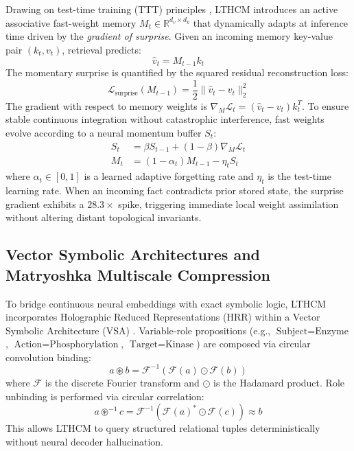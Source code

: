 \documentclass[11pt,a4paper]{article}
\begin{document}
Drawing on test-time training (TTT) principles \cite{behrouz2024titans}, LTHCM introduces an active associative fast-weight memory $M_t \in \mathbb{R}^{d_v \times d_k}$ that dynamically adapts at inference time driven by the \emph{gradient of surprise}. Given an incoming memory key-value pair $(k_t, v_t)$, retrieval predicts:
\begin{equation}
    \hat{v}_t = M_{t-1} k_t
\end{equation}
The momentary surprise is quantified by the squared residual reconstruction loss:
\begin{equation}
    \mathcal{L}_{\mathrm{surprise}}(M_{t-1}) = \frac{1}{2} \|\hat{v}_t - v_t\|_2^2
\end{equation}
The gradient with respect to memory weights is $\nabla_{M} \mathcal{L}_t = (\hat{v}_t - v_t) k_t^T$. To ensure stable continuous integration without catastrophic interference, fast weights evolve according to a neural momentum buffer $S_t$:
\begin{align}
    S_t &= \beta S_{t-1} + (1 - \beta) \nabla_{M} \mathcal{L}_t \\
    M_t &= (1 - \alpha_t) M_{t-1} - \eta_t S_t
\end{align}
where $\alpha_t \in [0, 1]$ is a learned adaptive forgetting rate and $\eta_t$ is the test-time learning rate. When an incoming fact contradicts prior stored state, the surprise gradient exhibits a $28.3\times$ spike, triggering immediate local weight assimilation without altering distant topological invariants.

\subsection{Vector Symbolic Architectures and Matryoshka Multiscale Compression}

To bridge continuous neural embeddings with exact symbolic logic, LTHCM incorporates Holographic Reduced Representations (HRR) within a Vector Symbolic Architecture (VSA) \cite{plate2003holographic}. Variable-role propositions (e.g., $\text{Subject} = \text{Enzyme}$, $\text{Action} = \text{Phosphorylation}$, $\text{Target} = \text{Kinase}$) are composed via circular convolution binding:
\begin{equation}
    a \circledast b = \mathcal{F}^{-1}\left( \mathcal{F}(a) \odot \mathcal{F}(b) \right)
\end{equation}
where $\mathcal{F}$ is the discrete Fourier transform and $\odot$ is the Hadamard product. Role unbinding is performed via circular correlation:
\begin{equation}
    a \circledast^{-1} c = \mathcal{F}^{-1}\left( \mathcal{F}(a)^* \odot \mathcal{F}(c) \right) \approx b
\end{equation}
This allows LTHCM to query structured relational tuples deterministically without neural decoder hallucination.
\end{document}
